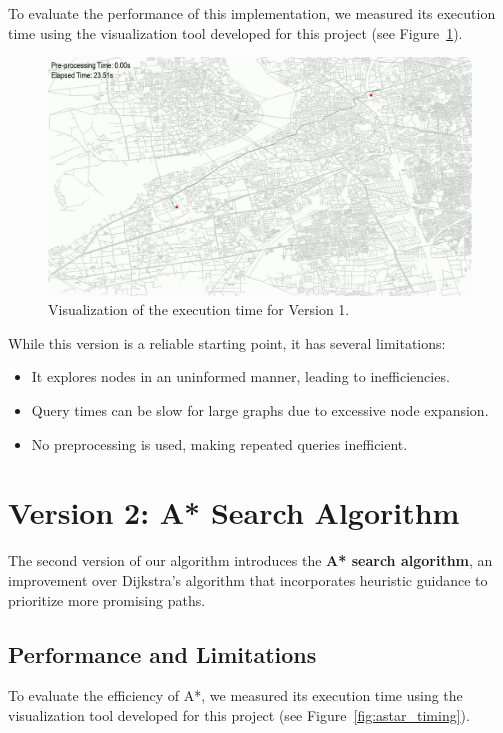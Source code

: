 	To evaluate the performance of this implementation, we measured its execution time using the visualization tool developed for this project (see Figure~\ref{fig:dijkstra_timing}).
	
	\begin{figure}[h]
		\centering
		\includegraphics[width=1.0\textwidth]{dijkstra.png}
		\caption{Visualization of the execution time for Version 1.}
		\label{fig:dijkstra_timing}
	\end{figure}
	
	While this version is a reliable starting point, it has several limitations:
	\begin{itemize}
		\item It explores nodes in an uninformed manner, leading to inefficiencies.
		\item Query times can be slow for large graphs due to excessive node expansion.
		\item No preprocessing is used, making repeated queries inefficient.
	\end{itemize}
	
	\section{Version 2: A* Search Algorithm}
	
	The second version of our algorithm introduces the \textbf{A* search algorithm}, an improvement over Dijkstra's algorithm that incorporates heuristic guidance to prioritize more promising paths.
	
	\subsection{Performance and Limitations}
	
	To evaluate the efficiency of A*, we measured its execution time using the visualization tool developed for this project (see Figure~\ref{fig:astar_timing}).
	
